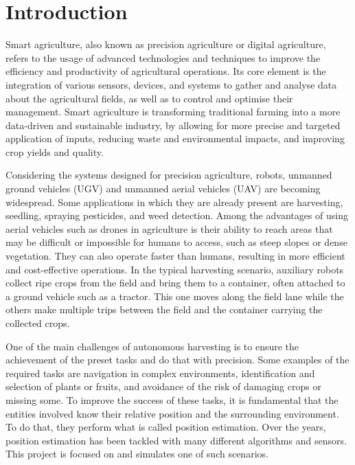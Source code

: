 \documentclass[letterpaper,twocolumn,10pt]{article}
\begin{document}
\section{Introduction}
Smart agriculture, also known as precision agriculture or digital agriculture, refers to the usage of advanced technologies and techniques to improve the efficiency and productivity of agricultural operations. Its core element is the integration of various sensors, devices, and systems to gather and analyse data about the agricultural fields, as well as to control and optimise their management. Smart agriculture is transforming traditional farming into a more data-driven and sustainable industry, by
allowing for more precise and targeted application of inputs, reducing waste and environmental impacts, and improving crop yields and quality. 


Considering the systems designed for precision agriculture, robots, unmanned ground vehicles (UGV) and unmanned aerial vehicles (UAV) are becoming widespread. Some applications in which they are already present are harvesting, seedling, spraying pesticides, and weed detection. 
Among the advantages of using aerial vehicles such as drones in agriculture is their ability to reach areas that may be difficult or impossible for humans to access, such as steep slopes or dense vegetation. They can also operate faster than humans, resulting in more efficient and cost-effective operations. 
In the typical harvesting scenario, auxiliary robots collect ripe crops from the field and bring them to a container, often attached to a ground vehicle such as a tractor. This one moves along the field lane while the others make multiple trips between the field and the container carrying the collected crops.

One of the main challenges of autonomous harvesting is to ensure the achievement of the preset tasks and do that with precision. 
Some examples of the required tasks are navigation in complex environments, identification and selection of plants or fruits, and avoidance of the risk of damaging crops or missing some.
To improve the success of these tasks, it is fundamental that the entities involved know their relative position and the surrounding environment. To do that, they perform what is called position estimation. Over the years, position estimation has been tackled with many different algorithms and sensors. This project is focused on and simulates one of such scenarios.
\end{document}
